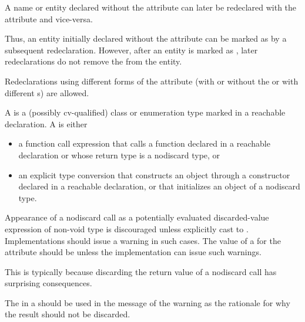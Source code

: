 \pnum
A name or entity declared without the  attribute
can later be redeclared with the attribute and vice-versa.
\begin{note}
Thus, an entity initially declared without the attribute
can be marked as 
by a subsequent redeclaration.
However, after an entity is marked as ,
later redeclarations do not remove the 
from the entity.
\end{note}
Redeclarations using different forms of the attribute
(with or without the 
or with different s)
are allowed.

\pnum
A  is
a (possibly cv-qualified) class or enumeration type
marked  in a reachable declaration.
A  is either
\begin{itemize}
\item
  a function call expression
  that calls a function declared  in a reachable declaration or
  whose return type is a nodiscard type, or
\item
  an explicit type
  conversion
  that constructs an object through
  a constructor declared  in a reachable declaration, or
  that initializes an object of a nodiscard type.
\end{itemize}

\pnum
\recommended
Appearance of a nodiscard call as
a potentially evaluated discarded-value expression
of non-void type
is discouraged unless explicitly cast to .
Implementations should issue a warning in such cases.
The value of
a  for the  attribute
should be  unless the implementation can issue such warnings.
\begin{note}
This is typically because discarding the return value
of a nodiscard call has surprising consequences.
\end{note}
The 
in a  
should be used in the message of the warning
as the rationale for why the result should not be discarded.

